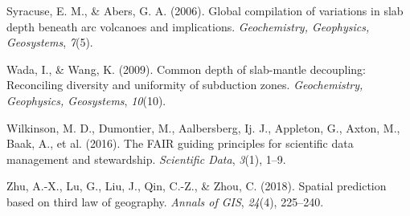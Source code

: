\documentclass[draft,linenumbers]{agujournal2018}
\newlength{\cslhangindent}
\newenvironment{CSLReferences}[3] %
 {%
  \setlength{\parindent}{0pt}
  \ifodd #1 \everypar{\setlength{\hangindent}{\cslhangindent}}\ignorespaces\fi
  \ifnum #2 > 0
  \setlength{\parskip}{#2\baselineskip}
  \fi
 }%
 {}
\begin{document}
\begin{CSLReferences}{1}{0}
\leavevmode{}%
Syracuse, E. M., \& Abers, G. A. (2006). Global compilation of
variations in slab depth beneath arc volcanoes and implications.
\emph{Geochemistry, Geophysics, Geosystems}, \emph{7}(5).

\leavevmode{}%
Wada, I., \& Wang, K. (2009). Common depth of slab-mantle decoupling:
Reconciling diversity and uniformity of subduction zones.
\emph{Geochemistry, Geophysics, Geosystems}, \emph{10}(10).

\leavevmode{}%
Wilkinson, M. D., Dumontier, M., Aalbersberg, Ij. J., Appleton, G.,
Axton, M., Baak, A., et al. (2016). The FAIR guiding principles for
scientific data management and stewardship. \emph{Scientific Data},
\emph{3}(1), 1--9.

\leavevmode{}%
Zhu, A.-X., Lu, G., Liu, J., Qin, C.-Z., \& Zhou, C. (2018). Spatial
prediction based on third law of geography. \emph{Annals of GIS},
\emph{24}(4), 225--240.

\end{CSLReferences}


\end{document}
